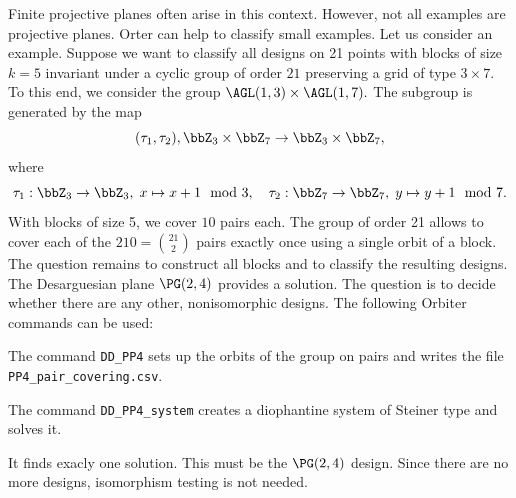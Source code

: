 Finite projective planes often arise in this context. 
However, not all examples are projective planes. Orter can help to classify small examples.
Let us consider an example. 
Suppose we want to classify all designs on 21 points with blocks of size $k=5$ 
invariant under a cyclic group of order $21$ preserving a grid of type $3 \times 7.$ 
To this end, we consider the group $\AGL(1,3) \times \AGL(1,7).$ 
The subgroup is generated by the map
$$
(\tau_1,\tau_2), \bbZ_3 \times \bbZ_7 \rightarrow  \bbZ_3 \times \bbZ_7,
$$ 
where 
$$
\tau_1: \bbZ_3 \rightarrow \bbZ_3, \; x \mapsto x+1 \mod 3,
\quad
\tau_2: \bbZ_7 \rightarrow \bbZ_7, \; y \mapsto y+1 \mod 7.
$$
With blocks of size 5, we cover $10$ pairs each. 
The group of order 21 allows to cover each of the $210={21\choose 2}$ pairs 
exactly once using a single orbit of a block.
The question remains to construct all blocks and to classify the resulting designs.
The Desarguesian plane $\PG(2,4)$ provides a solution. 
The question is to decide whether there are any other, nonisomorphic designs.
The following Orbiter commands can be used:
{\tt

}
{\tt

}
{\tt

}
The command \verb'DD_PP4' sets up the orbits of the group 
on pairs and writes the file \verb'PP4_pair_covering.csv'.
{\tt

}
The command \verb'DD_PP4_system' creates a diophantine system of Steiner type
and solves it. 
{\tt

}
It finds exacly one solution. 
This must be the $\PG(2,4)$ design.
Since there are no more designs, isomorphism testing is not needed.



